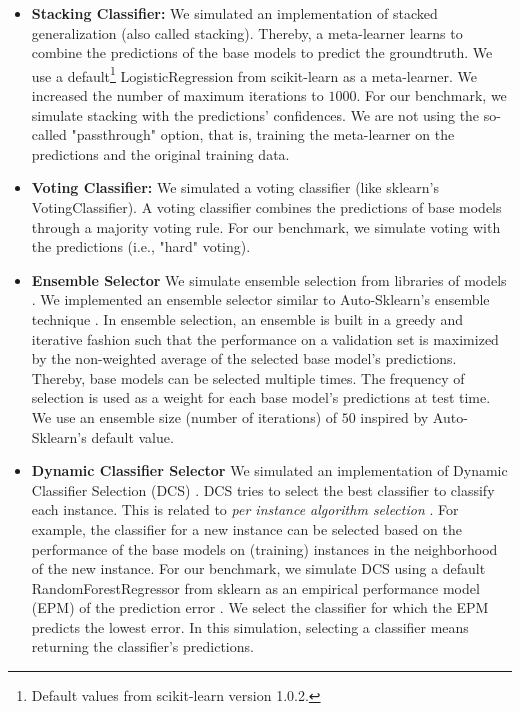\documentclass[11pt]{article}
\begin{document}
\label{appdx:ens_tech_details}
\begin{itemize}
\item \textbf{Stacking Classifier:} We simulated an implementation of stacked generalization \citep{DBLP:journals/nn/Wolpert92} (also called stacking).
Thereby, a meta-learner learns to combine the predictions of the base models to predict the groundtruth. We use a default\footnote{Default values from scikit-learn version 1.0.2.} LogisticRegression from scikit-learn \citep{scikit-learn} as a meta-learner. We increased the number of maximum iterations to $1000$. For our benchmark, we simulate stacking with the predictions' confidences. We are not using the so-called "passthrough" option, that is, training the meta-learner on the predictions and the original training data. 

\item \textbf{Voting Classifier:} We simulated a voting classifier (like sklearn's VotingClassifier). A voting classifier combines the predictions of base models through a majority voting rule. For our benchmark, we simulate voting with the predictions (i.e., "hard" voting). 

\item \textbf{Ensemble Selector} We simulate ensemble selection from libraries of models \citep{caruana2004ensemble}. We implemented an ensemble selector similar to Auto-Sklearn's ensemble technique \citep{feurer-neurips15a}. In ensemble selection, an ensemble is built in a greedy and iterative fashion such that the performance on a validation set is maximized by the non-weighted average of the selected base model's predictions. Thereby, base models can be selected multiple times. The frequency of selection is used as a weight for each base model's predictions at test time. We use an ensemble size (number of iterations) of $50$ inspired by Auto-Sklearn's default value. 

\item \textbf{Dynamic Classifier Selector} We simulated an implementation of Dynamic Classifier Selection (DCS) \citep{giacinto2001dynamic}. DCS tries to select the best classifier to classify each instance. This is related to \textit{per instance algorithm selection} \citep{rice1976algorithm}. For example, the classifier for a new instance can be selected based on the performance of the base models on (training) instances in the neighborhood of the new instance. For our benchmark, we simulate DCS using a default RandomForestRegressor from sklearn as an empirical performance model (EPM) of the prediction error \citep{DBLP:journals/ai/HutterXHL14}. We select the classifier for which the EPM predicts the lowest error. In this simulation, selecting a classifier means returning the classifier's predictions. 


\end{itemize}
\end{document}
